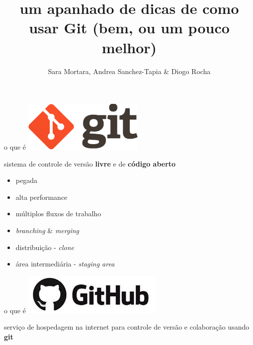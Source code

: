 \documentclass[11pt]{beamer}
\author{Sara Mortara, Andrea Sanchez-Tapia \& Diogo Rocha}
\title{um apanhado de dicas de como usar Git (bem, ou um pouco melhor)}
\begin{document}
\begin{frame}
\titlepage
\end{frame}


\begin{frame}{o que é \includegraphics[scale=0.2]{logo-git.png}}

sistema de controle de versão \textbf{livre} e de \textbf{código aberto}

\begin{itemize}
 \pause \item   pegada
 \pause \item alta performance
 \pause \item múltiplos fluxos de trabalho
 \pause \item \textit{branching} & \textit{merging}
 \pause \item distribuição - \textit{clone}
 \pause \item área intermediária - \textit{staging area}
\end{itemize}

\end{frame}

\begin{frame}{o que é \includegraphics[scale=0.2]{github.jpeg}}

serviço de hospedagem na internet para controle de versão e colaboração usando \textbf{git}

\begin{itemize}

\end{itemize}

\end{frame}
\end{document}
